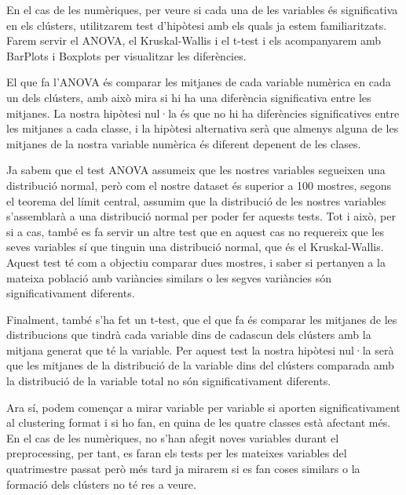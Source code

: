 \documentclass{article}
\begin{document}
En el cas de les numèriques, per veure si cada una de les variables és significativa en els clústers, utilitzarem test d'hipòtesi amb els quals ja estem familiaritzats. Farem servir el ANOVA, el Kruskal-Wallis i el t-test i els acompanyarem amb BarPlots i Boxplots per visualitzar les diferències.

El que fa l'ANOVA és comparar les mitjanes de cada variable numèrica en cada un dels clústers, amb això mira si hi ha una diferència significativa entre les mitjanes. La nostra hipòtesi nul·la és que no hi ha diferències significatives entre les mitjanes a cada classe, i la hipòtesi alternativa serà que almenys alguna de les mitjanes de la nostra variable numèrica és diferent depenent de les clases. 

Ja sabem que el test ANOVA assumeix que les nostres variables segueixen una distribució normal, però com el nostre dataset és superior a 100 mostres, segons el teorema del límit central, assumim que la distribució de les nostres variables s'assemblarà a una distribució normal per poder fer aquests tests. Tot i això, per si a cas, també es fa servir un altre test que en aquest cas no requereix que les seves variables sí que tinguin una distribució normal, que és el Kruskal-Wallis. Aquest test té com a objectiu comparar dues mostres, i saber si pertanyen a la mateixa població amb variàncies similars o les segves variàncies són significativament diferents. 

Finalment, també s'ha fet un t-test, que el que fa és comparar les mitjanes de les distribucions que tindrà cada variable dins de cadascun dels clústers amb la mitjana generat que té la variable. Per aquest test la nostra hipòtesi nul·la serà que les mitjanes de la distribució de la variable dins del clústers comparada amb la distribució de la variable total no són significativament diferents. 

Ara sí, podem començar a mirar variable per variable si aporten significativament al clustering format i si ho fan, en quina de les quatre classes està afectant més. En el cas de les numèriques, no s'han afegit noves variables durant el preprocessing, per tant, es faran els tests per les mateixes variables del quatrimestre passat però més tard ja mirarem si es fan coses similars o la formació dels clústers no té res a veure. 
\end{document}
